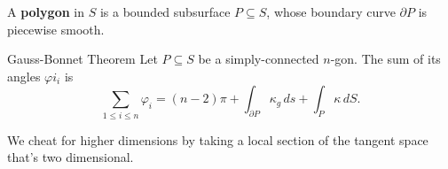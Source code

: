 \begin{definition}[]
    A \textbf{polygon} in $S$ is a bounded subsurface $P \subseteq S$, whose boundary curve $\partial P$ is piecewise smooth.
\end{definition}
\begin{namedthm}{Gauss-Bonnet Theorem}
   Let $P \subseteq S$ be a simply-connected $n$-gon. The sum of its angles $\varphi i _i $ is \[
       \sum _{ 1\leq i \leq n}\varphi  _i = (n-2) \pi + \int_{\partial P}^{} \kappa_g \, ds+ \int_{P}^{} \kappa \, dS.
   \]  
\end{namedthm}
We cheat for higher dimensions by taking a local section of the tangent space that's two dimensional.
